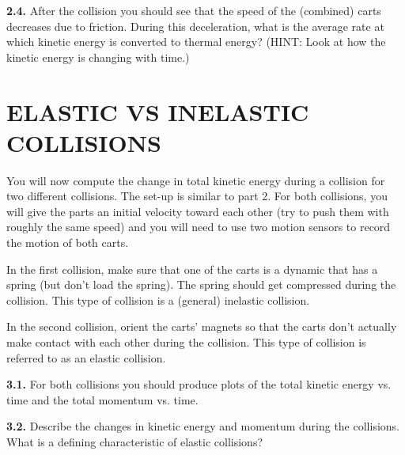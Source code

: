 \documentclass[11pt,letterpaper]{article}
\begin{document}
\textbf{2.4.} After the collision you should see that the speed of the (combined) carts decreases due to friction. During this deceleration, what is the average rate at which kinetic energy is converted to thermal energy? (HINT: Look at how the kinetic energy is changing with time.)



\section{ELASTIC VS INELASTIC COLLISIONS}
You will now compute the change in total kinetic energy during a collision for two different collisions.  The set-up is similar to part 2. For both collisions, you will give the parts an initial velocity toward each other (try to push them with roughly the same speed) and you will need to use two motion sensors to record the motion of both carts. 

In the first collision, make sure that one of the carts is a dynamic that has a spring (but don't load the spring). The spring should get compressed during the collision. This type of collision is a (general) inelastic collision. 

In the second collision, orient the carts' magnets so that the carts don't actually make contact with each other during the collision. This type of collision is referred to as an elastic collision.

\textbf{3.1.} For both collisions you should produce plots of the total kinetic energy vs. time and the total momentum vs. time.

\textbf{3.2.} Describe the changes in kinetic energy and momentum during the collisions. What is a defining characteristic of elastic collisions?
\end{document}

